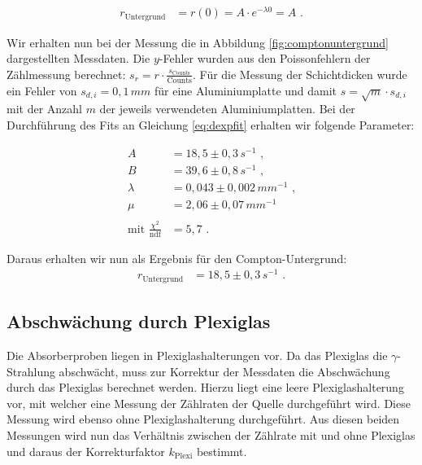 \begin{align}
	r_\text{Untergrund}&=r(0)=A\cdot e^{-\lambda 0}=A\text{ .}\label{eq:dexpfit}
\end{align}


Wir erhalten nun bei der Messung die in Abbildung \ref{fig:comptonuntergrund} dargestellten Messdaten. Die $y$-Fehler wurden aus den Poissonfehlern der Zählmessung berechnet: $s_r=r\cdot\frac{s_\text{Counts}}{\mathrm{Counts}}$. Für die Messung der Schichtdicken wurde ein Fehler von $s_{d,i}=0,1\,\si{mm}$ für eine Aluminiumplatte und damit $s=\sqrt{m}\cdot s_{d,i}$ mit der Anzahl $m$ der jeweils verwendeten Aluminiumplatten. Bei der Durchführung des Fits an Gleichung \ref{eq:dexpfit} erhalten wir folgende Parameter:

\begin{align*}
		A&=18,5\pm0,3\,\si{s^{-1}}\text{ ,}\\
		B&=39,6\pm0,8\,\si{s^{-1}}\text{ ,}\\
		\lambda&=0,043\pm0,002\,\si{mm^{-1}}\text{ ,}\\
		\mu&=2,06\pm0,07\,\si{mm^{-1}}\\
		\ \\
		\text{mit }\frac{\chi^2}{\mathrm{ndf}}&=5,7\text{ .}
\end{align*}

Daraus erhalten wir nun als Ergebnis für den Compton-Untergrund:
\begin{align}
	r_\text{Untergrund}&=18,5\pm0,3\,\si{s^{-1}}\text{ .}
\end{align}

\subsection{Abschwächung durch Plexiglas}

Die Absorberproben liegen in Plexiglashalterungen vor. Da das Plexiglas die $\gamma$-Strahlung abschwächt, muss zur Korrektur der Messdaten die Abschwächung durch das Plexiglas berechnet werden. Hierzu liegt eine leere Plexiglashalterung vor, mit welcher eine Messung der Zählraten der Quelle durchgeführt wird. Diese Messung wird ebenso ohne Plexiglashalterung durchgeführt. Aus diesen beiden Messungen wird nun das Verhältnis zwischen der Zählrate mit und ohne Plexiglas und daraus der Korrekturfaktor $k_\text{Plexi}$ bestimmt.\\

